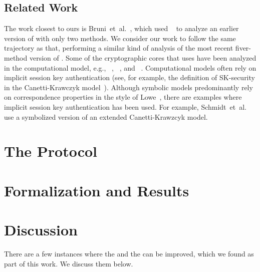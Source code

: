 \documentclass[runningheads, envcountsame, a4paper, draft, x11names]{llncs}
\newcommand{\spacehack}{\vspace{-1em}}
\newcommand{\fillhack}{\vspace{-0.5em}}
\begin{document}
\subsection{Related Work}
\label{sec:relatedWork}
\fillhack
The work closest to ours is Bruni~et~al.~\cite{DBLP:conf/secsr/BruniJPS18},
which used \mProverif~\cite{DBLP:conf/csfw/Blanchet01} to analyze an earlier
version of \mEdhoc{} with only two methods.
%
We consider our work to follow the same trajectory as that, performing a
similar kind of analysis of the most recent fiver-method version of \mEdhoc{}.
%
Some of the cryptographic cores that \mEdhoc{} uses have been analyzed in the
computational model, e.g., \mSigma{}~\cite{DBLP:conf/crypto/CanettiK02},
\mOptls{}~\cite{DBLP:conf/eurosp/KrawczykW16}, and
\mNoise{}~\cite{DBLP:conf/eurosp/KobeissiNB19}.
%
Computational models often rely on implicit session key authentication
(see, for example, the definition of SK-security in the Canetti-Krawczyk
model~\cite{DBLP:conf/crypto/CanettiK02}).
%
Although symbolic models predominantly rely on correspondence properties
in the style of Lowe~\cite{DBLP:conf/csfw/Lowe97a},
there are examples where implicit session key authentication has been used.
%
For example, Schmidt~et~al.~\cite{DBLP:conf/csfw/SchmidtMCB12} use a
symbolized version of an extended Canetti-Krawzcyk model.
%

\spacehack
\section{The \mEdhoc{} Protocol}
\label{sec:edhoc}


\spacehack
\section{Formalization and Results}
\label{sec:formalization}


\spacehack
\section{Discussion}
\label{sec:discussion}
\fillhack
There are a few instances where the \mEdhoc{} and the \mSpec{} can be improved,
which we found as part of this work. We discuss them below.
%
\spacehack
\end{document}
